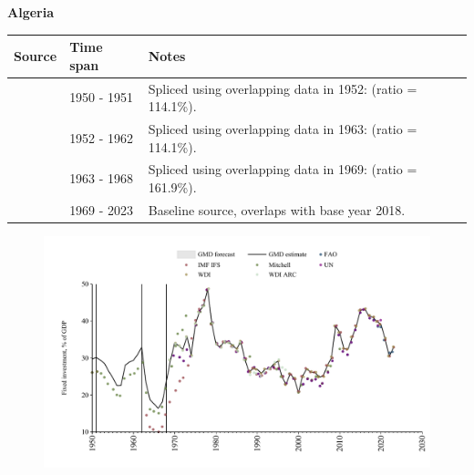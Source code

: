 \documentclass[12pt,a4paper,landscape]{article}
\begin{document}
\begin{adjustbox}{max totalsize={\paperwidth}{\paperheight},center}
\begin{minipage}[t][\textheight][t]{\textwidth}
\vspace*{0.5cm}
{}
\begin{center}
{\Large\bfseries Algeria}
\end{center}
\vspace{0.5cm}
\begin{table}[H]
\centering
\small
\begin{tabular}{|l|l|l|}
\hline
\textbf{Source} & \textbf{Time span} & \textbf{Notes} \\
\hline
\rowcolor{white}\cite{IMF_IFS}& 1950 - 1951 &Spliced using overlapping data in 1952: (ratio = 114.1\%).\\
\rowcolor{lightgray}\cite{Mitchell}& 1952 - 1962 &Spliced using overlapping data in 1963: (ratio = 114.1\%).\\
\rowcolor{white}\cite{IMF_IFS}& 1963 - 1968 &Spliced using overlapping data in 1969: (ratio = 161.9\%).\\
\rowcolor{lightgray}\cite{WDI}& 1969 - 2023 &Baseline source, overlaps with base year 2018.\\
\hline
\end{tabular}
\end{table}
\begin{figure}[H]
\centering
\includegraphics[width=\textwidth,height=0.6\textheight,keepaspectratio]{graphs/DZA_finv_GDP.pdf}
\end{figure}
\end{minipage}
\end{adjustbox}
\end{document}
